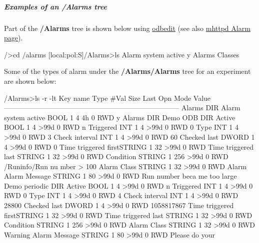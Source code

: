 \par
\hypertarget{RC_customize_ODB_RC_alarms_tree_example}{}\subparagraph{Examples of an /Alarms tree}\label{RC_customize_ODB_RC_alarms_tree_example}
Part of the {\bfseries  /Alarms } tree is shown below using \hyperlink{RC_odbedit_utility}{odbedit} (see also \hyperlink{RC_mhttpd_Alarm_page}{mhttpd Alarm page}).


\begin{DoxyCode}
/>cd /alarms
[local:pol:S]/Alarms>ls
Alarm system active             y
Alarms
Classes
\end{DoxyCode}


Some of the types of alarm under the {\bfseries  /Alarms/Alarms } tree for an experiment are shown below: 
\begin{DoxyCode}
/Alarms>ls -r -lt
Key name                        Type    #Val  Size  Last Opn Mode Value
---------------------------------------------------------------------------
Alarms                          DIR
    Alarm system active         BOOL    1     4     4h   0   RWD  y
    Alarms                      DIR
        Demo ODB                DIR
            Active              BOOL    1     4     >99d 0   RWD  n
            Triggered           INT     1     4     >99d 0   RWD  0
            Type                INT     1     4     >99d 0   RWD  3
            Check interval      INT     1     4     >99d 0   RWD  60
            Checked last        DWORD   1     4     >99d 0   RWD  0
            Time triggered firstSTRING  1     32    >99d 0   RWD
            Time triggered last STRING  1     32    >99d 0   RWD
            Condition           STRING  1     256   >99d 0   RWD  /Runinfo/Run nu
      mber > 100
            Alarm Class         STRING  1     32    >99d 0   RWD  Alarm
            Alarm Message       STRING  1     80    >99d 0   RWD  Run number beca
      me too large
        Demo periodic           DIR
              Active              BOOL    1     4     >99d 0   RWD  n
            Triggered           INT     1     4     >99d 0   RWD  0
            Type                INT     1     4     >99d 0   RWD  4
            Check interval      INT     1     4     >99d 0   RWD  28800
            Checked last        DWORD   1     4     >99d 0   RWD  1058817867
            Time triggered firstSTRING  1     32    >99d 0   RWD
            Time triggered last STRING  1     32    >99d 0   RWD
            Condition           STRING  1     256   >99d 0   RWD
            Alarm Class         STRING  1     32    >99d 0   RWD  Warning
            Alarm Message       STRING  1     80    >99d 0   RWD  Please do your 

\end{DoxyCode}
